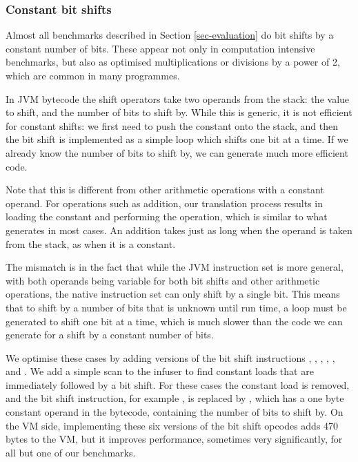 \subsubsection{Constant bit shifts}
\label{sec-opt-constant-shift}

Almost all benchmarks described in Section \ref{sec-evaluation} do bit shifts by a constant number of bits. These appear not only in computation intensive benchmarks, but also as optimised multiplications or divisions by a power of 2, which are common in many programmes.

In JVM bytecode the shift operators take two operands from the stack: the value to shift, and the number of bits to shift by. While this is generic, it is not efficient for constant shifts: we first need to push the constant onto the stack, and then the bit shift is implemented as a simple loop which shifts one bit at a time. If we already know the number of bits to shift by, we can generate much more efficient code.

Note that this is different from other arithmetic operations with a constant operand. For operations such as addition, our translation process results in loading the constant and performing the operation, which is similar to what  generates in most cases. An addition takes just as long when the operand is taken from the stack, as when it is a constant. 

The mismatch is in the fact that while the JVM instruction set is more general, with both operands being variable for both bit shifts and other arithmetic operations, the native instruction set can only shift by a single bit. This means that to shift by a number of bits that is unknown until run time, a loop must be generated to shift one bit at a time, which is much slower than the code we can generate for a shift by a constant number of bits.

We optimise these cases by adding  versions of the bit shift instructions , , , , , and . We add a simple scan to the infuser to find constant loads that are immediately followed by a bit shift. For these cases the constant load is removed, and the bit shift instruction, for example , is replaced by , which has a one byte constant operand in the bytecode, containing the number of bits to shift by. On the VM side, implementing these six  versions of the bit shift opcodes adds 470 bytes to the VM, but it improves performance, sometimes very significantly, for all but one of our benchmarks.

